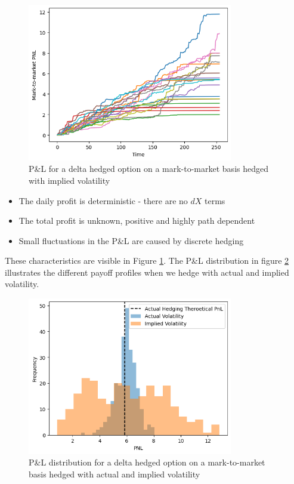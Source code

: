 \documentclass{article}
\begin{document}
\begin{figure}[h]
    \centering
    \includegraphics[width=0.8\textwidth]{images/implied_volatility_hedging.png}
    \caption{P\&L for a delta hedged option on a mark-to-market basis hedged with implied volatility}
    \label{fig:implied_volatility_hedging}
\end{figure}

\begin{itemize}
    \item The daily profit is deterministic - there are no $dX$ terms
    \item The total profit is unknown, positive and highly path dependent 
    \item Small fluctuations in the P\&L are caused by discrete hedging
\end{itemize}

These characteristics are visible in Figure \ref{fig:implied_volatility_hedging}. The P\&L distribution in figure \ref{fig:pnl_distribution} illustrates the 
different payoff profiles when we hedge with actual and implied volatility. 

\begin{figure}[h]
    \centering
    \includegraphics[width=0.8\textwidth]{images/pnl_distribution.png}
    \caption{P\&L distribution for a delta hedged option on a mark-to-market basis hedged with actual and implied volatility}
    \label{fig:pnl_distribution}
\end{figure}
\end{document}
